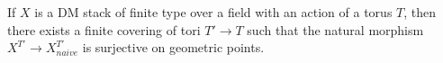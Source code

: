 \begin{lemma}\label{rl-000P}\label{lem:finite-cover}
  If $X$ is a DM stack of finite type over a field with an action of a torus $T$, then there exists a finite covering of tori $T'\to T$ such that the natural morphism $X^{T'} \to X^{T'}_{naive}$ is surjective on geometric points.
\end{lemma}
